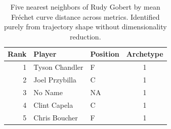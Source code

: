 \begin{table}[htbp]
  \centering\small
  \begin{tabular}{rllc}
    \toprule
    Rank & Player & Position & Archetype \\
    \midrule
    1 & Tyson Chandler & F & 1 \\
    2 & Joel Przybilla & C & 1 \\
    3 & No Name & NA & 1 \\
    4 & Clint Capela & C & 1 \\
    5 & Chris Boucher & F & 1 \\
    \bottomrule
  \end{tabular}
  \caption{Five nearest neighbors of Rudy Gobert by mean Fr\'{e}chet curve distance across metrics. Identified purely from trajectory shape without dimensionality reduction.}
  \label{tab:Rudy_Gobert_frechet_curve_neighbors}
\end{table}

